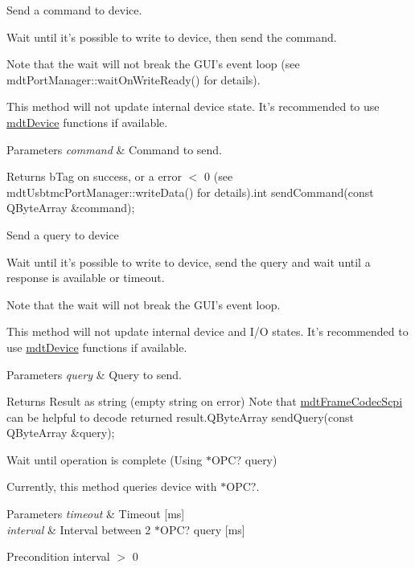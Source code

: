 Send a command to device. 

Wait until it's possible to write to device, then send the command.

Note that the wait will not break the G\-U\-I's event loop (see mdt\-Port\-Manager\-::wait\-On\-Write\-Ready() for details).

This method will not update internal device state. It's recommended to use \hyperlink{classmdt_device}{mdt\-Device} functions if available.


\begin{DoxyParams}{Parameters}
{\em command} & Command to send. \\
\hline
\end{DoxyParams}
\begin{DoxyReturn}{Returns}
b\-Tag on success, or a error $<$ 0 (see mdt\-Usbtmc\-Port\-Manager\-::write\-Data() for details).int send\-Command(const Q\-Byte\-Array \&command);
\end{DoxyReturn}
Send a query to device

Wait until it's possible to write to device, send the query and wait until a response is available or timeout.

Note that the wait will not break the G\-U\-I's event loop.

This method will not update internal device and I/\-O states. It's recommended to use \hyperlink{classmdt_device}{mdt\-Device} functions if available.


\begin{DoxyParams}{Parameters}
{\em query} & Query to send. \\
\hline
\end{DoxyParams}
\begin{DoxyReturn}{Returns}
Result as string (empty string on error) Note that \hyperlink{classmdt_frame_codec_scpi}{mdt\-Frame\-Codec\-Scpi} can be helpful to decode returned result.\-Q\-Byte\-Array send\-Query(const Q\-Byte\-Array \&query);
\end{DoxyReturn}
Wait until operation is complete (Using $\ast$\-O\-P\-C? query)

Currently, this method queries device with $\ast$\-O\-P\-C?.


\begin{DoxyParams}{Parameters}
{\em timeout} & Timeout \mbox{[}ms\mbox{]} \\
\hline
{\em interval} & Interval between 2 $\ast$\-O\-P\-C? query \mbox{[}ms\mbox{]} \\
\hline
\end{DoxyParams}
\begin{DoxyPrecond}{Precondition}
interval $>$ 0 
\end{DoxyPrecond}


